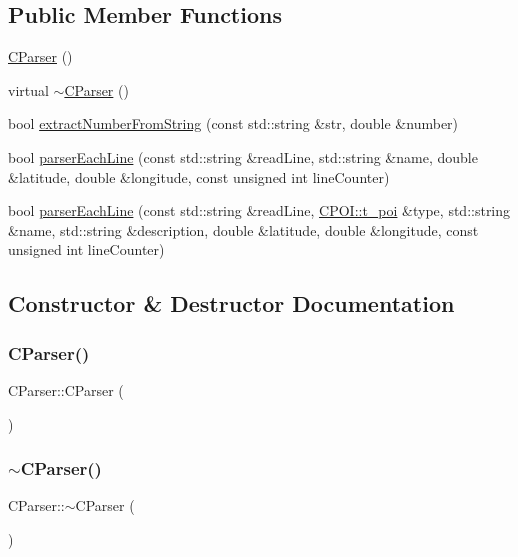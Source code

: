 \subsection*{Public Member Functions}
\begin{DoxyCompactItemize}
\item 
\hyperlink{classCParser_aa6372ef4dbf7d11dc4c51f4f4abd1750}{C\+Parser} ()
\item 
virtual \hyperlink{classCParser_acabd3b10aa5593fe571fe55426a7916f}{$\sim$\+C\+Parser} ()
\item 
bool \hyperlink{classCParser_a4bd9b28a9d6512c10b2b5af3ff36495f}{extract\+Number\+From\+String} (const std\+::string \&str, double \&number)
\item 
bool \hyperlink{classCParser_a2bfd12df0bb7928de4a0ad50230a2e19}{parser\+Each\+Line} (const std\+::string \&read\+Line, std\+::string \&name, double \&latitude, double \&longitude, const unsigned int line\+Counter)
\item 
bool \hyperlink{classCParser_a5d04d85e9ccaf568a50b7cfe071b7bf3}{parser\+Each\+Line} (const std\+::string \&read\+Line, \hyperlink{classCPOI_a4b95e2e14055d2f9ca134e474dd4a19f}{C\+P\+O\+I\+::t\+\_\+poi} \&type, std\+::string \&name, std\+::string \&description, double \&latitude, double \&longitude, const unsigned int line\+Counter)
\end{DoxyCompactItemize}


\subsection{Constructor \& Destructor Documentation}
\mbox{\label{classCParser_aa6372ef4dbf7d11dc4c51f4f4abd1750}} 
\subsubsection{\texorpdfstring{C\+Parser()}{CParser()}}
{\footnotesize\ttfamily C\+Parser\+::\+C\+Parser (\begin{DoxyParamCaption}{ }\end{DoxyParamCaption})}

\mbox{\label{classCParser_acabd3b10aa5593fe571fe55426a7916f}} 
\subsubsection{\texorpdfstring{$\sim$\+C\+Parser()}{~CParser()}}
{\footnotesize\ttfamily C\+Parser\+::$\sim$\+C\+Parser (\begin{DoxyParamCaption}{ }\end{DoxyParamCaption})\hspace{0.3cm}{\ttfamily [virtual]}}



